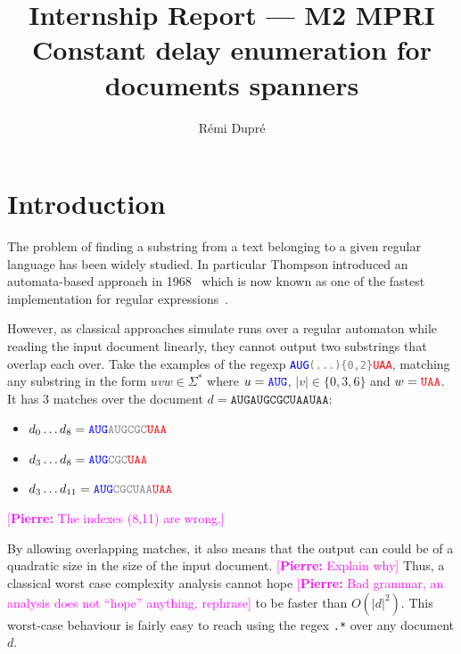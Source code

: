 \documentclass[12px]{article}
\title{%
  Internship Report --- M2 MPRI \\
  Constant delay enumeration for documents spanners
}
\author{Rémi Dupré}
\theoremstyle{definition}
\newcommand{\pierre}[1]{\textcolor{magenta}{[\textbf{Pierre:} #1]}}
\begin{document}
  \maketitle

  
  \pagebreak
  \tableofcontents
  \pagebreak

  \section{Introduction}

    The problem of finding a substring from a text belonging to a given regular
    language has been widely studied. In particular Thompson introduced an
    automata-based approach in 1968~\cite{thompson1968programming} which is now
    known as one of the fastest implementation for regular
    expressions~\cite{cox2007regular}.

    However, as classical approaches simulate runs over a regular automaton
    while reading the input document linearly, they cannot output two
    substrings that overlap each over. Take the examples of the regexp
    \texttt{\textcolor{blue}{AUG}\textcolor{gray}{(...)\{0,2\}}\textcolor{red}{UAA}},
    matching any substring in the form $uvw \in \Sigma^*$ where $u =
    \texttt{\textcolor{blue}{AUG}}$, $|v| \in \{0, 3, 6\}$ and $w =
    \texttt{\textcolor{red}{UAA}}$. It has 3 matches over the document $d =
    \texttt{AUGAUGCGCUAAUAA}$:
      \begin{itemize}
        \item $d_0 \ldots d_8 =
          \texttt{\textcolor{blue}{AUG}\textcolor{gray}{AUGCGC}\textcolor{red}{UAA}}$
        \item $d_3 \ldots d_8 =
          \texttt{\textcolor{blue}{AUG}\textcolor{gray}{CGC}\textcolor{red}{UAA}}$
        \item $d_3 \ldots d_{11} =
          \texttt{\textcolor{blue}{AUG}\textcolor{gray}{CGCUAA}\textcolor{red}{UAA}}$
      \end{itemize}
      \pierre{The indexes (8,11) are wrong.}

    By allowing overlapping matches, it also means that the output can could be
    of a quadratic size in the size of the input document.
    \pierre{Explain why} Thus, a classical
    worst case complexity analysis cannot hope \pierre{Bad grammar, an
    analysis does not ``hope'' anything, rephrase} to be faster than $O(|d|^2)$.
    This worst-case behaviour is fairly easy to reach using the regex
    \texttt{.*} over any document $d$.
\end{document}
